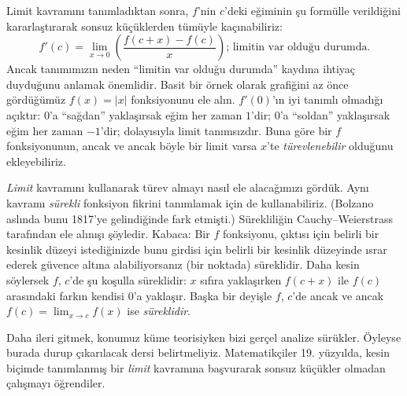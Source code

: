 \documentclass[../../../include/open-logic-section]{subfiles}
\begin{document}
Limit kavramını tanımladıktan sonra, $f$'nin $c$'deki eğiminin şu formülle
verildiğini kararlaştırarak sonsuz küçüklerden tümüyle kaçınabiliriz:
\[
	{f}'(c) = \lim_{x \rightarrow 0}\left(\frac{f(c +x) - f(c)}{x}\right) \text{; limitin var olduğu durumda.}
\]
Ancak tanımımızın neden ``limitin var olduğu durumda'' kaydına ihtiyaç
duyduğunu anlamak önemlidir. Basit bir örnek olarak grafiğini az önce
gördüğümüz $f(x) = |x|$ fonksiyonunu ele alın. $f'(0)$'ın iyi tanımlı
olmadığı açıktır: $0$'a ``sağdan'' yaklaşırsak eğim her zaman $1$'dir;
$0$'a ``soldan'' yaklaşırsak eğim her zaman $-1$'dir; dolayısıyla limit
tanımsızdır. Buna göre bir $f$ fonksiyonunun, ancak ve ancak böyle bir limit
varsa $x$'te \emph{türevlenebilir} olduğunu ekleyebiliriz.

\emph{Limit} kavramını kullanarak türev almayı nasıl ele alacağımızı gördük.
Aynı kavramı \emph{sürekli} fonksiyon fikrini tanımlamak için de
kullanabiliriz. (Bolzano aslında bunu 1817'ye gelindiğinde fark etmişti.)
Sürekliliğin Cauchy--Weierstrass tarafından ele alınışı şöyledir. Kabaca: Bir
$f$ fonksiyonu, çıktısı için belirli bir kesinlik düzeyi istediğinizde bunu
girdisi için belirli bir kesinlik düzeyinde ısrar ederek güvence altına
alabiliyorsanız (bir noktada) süreklidir. Daha kesin söylersek $f$, $c$'de şu
koşulla süreklidir: $x$ sıfıra yaklaşırken $f(c + x)$ ile $f(c)$ arasındaki
farkın kendisi $0$'a yaklaşır. Başka bir deyişle $f$, $c$'de ancak ve ancak
$f(c) = \lim_{x \rightarrow c} f(x)$ ise \emph{süreklidir}.

Daha ileri gitmek, konumuz küme teorisiyken bizi gerçel analize sürükler.
Öyleyse burada durup çıkarılacak dersi belirtmeliyiz. Matematikçiler 19.
yüzyılda, kesin biçimde tanımlanmış bir \emph{limit} kavramına başvurarak
sonsuz küçükler olmadan çalışmayı öğrendiler.
\end{document}
